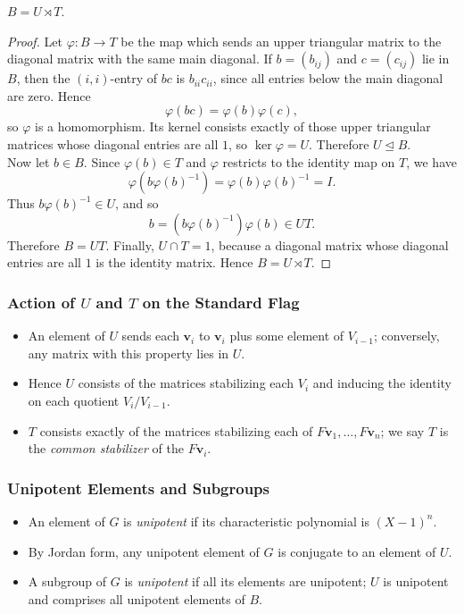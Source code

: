 \documentclass[../Odyssey_Project.tex]{subfiles}
\begin{document}
\begin{proposition}
\label{prop:5.1}
$B = U \rtimes T$.
\end{proposition}
\begin{proof}
Let $\varphi \colon B \to T$ be the map which sends an upper triangular matrix to the diagonal matrix with the same main diagonal. If $b=(b_{ij})$ and $c=(c_{ij})$ lie in $B$, then the $(i,i)$-entry of $bc$ is $b_{ii}c_{ii}$, since all entries below the main diagonal are zero. Hence
\[
    \varphi(bc)=\varphi(b)\varphi(c),
\]
so $\varphi$ is a homomorphism. Its kernel consists exactly of those upper triangular matrices whose diagonal entries are all $1$, so $\ker \varphi=U$. Therefore $U \trianglelefteq B$.\\
Now let $b \in B$. Since $\varphi(b) \in T$ and $\varphi$ restricts to the identity map on $T$, we have
\[
    \varphi(b\varphi(b)^{-1})=\varphi(b)\varphi(b)^{-1}=I.
\]
Thus $b\varphi(b)^{-1} \in U$, and so
\[
    b=(b\varphi(b)^{-1})\varphi(b) \in UT.
\]
Therefore $B=UT$. Finally, $U \cap T=1$, because a diagonal matrix whose diagonal entries are all $1$ is the identity matrix. Hence $B=U \rtimes T$.
\end{proof}

\subsubsection*{Action of $U$ and $T$ on the Standard Flag}
\begin{itemize}
    \item An element of $U$ sends each $\mathbf{v}_i$ to $\mathbf{v}_i$ plus some element of $V_{i-1}$; conversely, any matrix with this property lies in $U$.
    \item Hence $U$ consists of the matrices stabilizing each $V_i$ and inducing the identity on each quotient $V_i / V_{i-1}$.
    \item $T$ consists exactly of the matrices stabilizing each of $F\mathbf{v}_1, \dots, F\mathbf{v}_n$; we say $T$ is the \emph{common stabilizer} of the $F\mathbf{v}_i$.
\end{itemize}

\subsubsection*{Unipotent Elements and Subgroups}
\begin{itemize}
    \item An element of $G$ is \emph{unipotent} if its characteristic polynomial is $(X - 1)^n$.
    \item By Jordan form, any unipotent element of $G$ is conjugate to an element of $U$.
    \item A subgroup of $G$ is \emph{unipotent} if all its elements are unipotent; $U$ is unipotent and comprises all unipotent elements of $B$.
\end{itemize}
\end{document}

